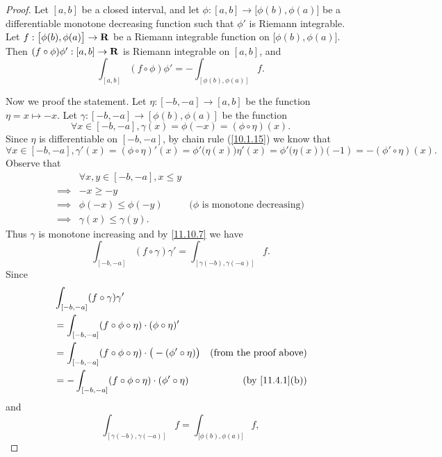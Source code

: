 \begin{proof}
  Let \([a, b]\) be a closed interval, and let \(\phi : [a, b] \to \big[\phi(b), \phi(a)\big]\) be a differentiable monotone decreasing function such that \(\phi'\) is Riemann integrable.
  Let \(f : \big[\phi(b), \phi(a)\big] \to \mathbf{R}\) be a Riemann integrable function on \(\big[\phi(b), \phi(a)\big]\).
  Then \((f \circ \phi) \phi' : [a, b] \to \mathbf{R}\) is Riemann integrable on \([a, b]\), and
  \[
    \int_{[a, b]} (f \circ \phi) \phi' = -\int_{[\phi(b), \phi(a)]} f.
  \]

  Now we proof the statement.
  Let \(\eta : [-b, -a] \to [a, b]\) be the function \(\eta = x \mapsto -x\).
  Let \(\gamma : [-b, -a] \to [\phi(b), \phi(a)]\) be the function
  \[
    \forall x \in [-b, -a], \gamma(x) = \phi(-x) = (\phi \circ \eta)(x).
  \]
  Since \(\eta\) is differentiable on \([-b, -a]\), by chain rule (\cref{10.1.15}) we know that
  \[
    \forall x \in [-b, -a], \gamma'(x) = (\phi \circ \eta)'(x) = \phi'\big(\eta(x)\big) \eta'(x) = \phi'\big(\eta(x)\big) (-1) = - (\phi' \circ \eta)(x).
  \]
  Observe that
  \begin{align*}
             & \forall x, y \in [-b, -a], x \leq y                                            \\
    \implies & -x \geq -y                                                                     \\
    \implies & \phi(-x) \leq \phi(-y)              & \text{(\(\phi\) is monotone decreasing)} \\
    \implies & \gamma(x) \leq \gamma(y).
  \end{align*}
  Thus \(\gamma\) is monotone increasing and by \cref{11.10.7} we have
  \[
    \int_{[-b, -a]} (f \circ \gamma) \gamma' = \int_{[\gamma(-b), \gamma(-a)]} f.
  \]
  Since
  \begin{align*}
     & \int_{[-b, -a]} (f \circ \gamma) \gamma'                                                                        \\
     & = \int_{[-b, -a]} (f \circ \phi \circ \eta) \cdot (\phi \circ \eta)'                                            \\
     & = \int_{[-b, -a]} (f \circ \phi \circ \eta) \cdot \big(-(\phi' \circ \eta)\big) & \text{(from the proof above)} \\
     & = -\int_{[-b, -a]} (f \circ \phi \circ \eta) \cdot (\phi' \circ \eta)           & \text{(by \cref{11.4.1}(b))}
  \end{align*}
  and
  \[
    \int_{[\gamma(-b), \gamma(-a)]} f = \int_{\big[\phi(b), \phi(a)\big]} f,
\]
\end{proof}
